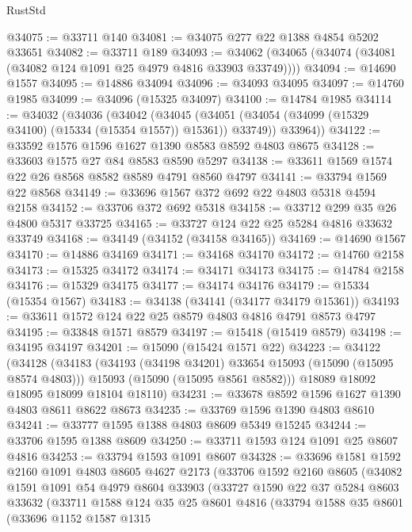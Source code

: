 \begin{lexlean}{RustStd}
\begin{coremodule}
@34075 := @33711 @140
@34081 := @34075 @277 @22 @1388 @4854 @5202 @33651
@34082 := @33711 @189
@34093 := @34062 (@34065 (@34074 (@34081 (@34082 @124 @1091 @25 @4979 @4816 @33903 @33749))))
@34094 := @14690 @1557
@34095 := @14886 @34094
@34096 := @34093 @34095
@34097 := @14760 @1985
@34099 := @34096 (@15325 @34097)
@34100 := @14784 @1985
@34114 := @34032
    (@34036
      (@34042
        (@34045 (@34051 (@34054 (@34099 (@15329 @34100) (@15334 (@15354 @1557)) @15361)) @33749))
        @33964))
@34122 := @33592 @1576 @1596 @1627 @1390 @8583 @8592 @4803 @8675
@34128 := @33603 @1575 @27 @84 @8583 @8590 @5297
@34138 := @33611 @1569 @1574 @22 @26 @8568 @8582 @8589 @4791 @8560 @4797
@34141 := @33794 @1569 @22 @8568
@34149 := @33696 @1567 @372 @692 @22 @4803 @5318 @4594 @2158
@34152 := @33706 @372 @692 @5318
@34158 := @33712 @299 @35 @26 @4800 @5317 @33725
@34165 := @33727 @124 @22 @25 @5284 @4816 @33632 @33749
@34168 := @34149 (@34152 (@34158 @34165))
@34169 := @14690 @1567
@34170 := @14886 @34169
@34171 := @34168 @34170
@34172 := @14760 @2158
@34173 := @15325 @34172
@34174 := @34171 @34173
@34175 := @14784 @2158
@34176 := @15329 @34175
@34177 := @34174 @34176
@34179 := @15334 (@15354 @1567)
@34183 := @34138 (@34141 (@34177 @34179 @15361))
@34193 := @33611 @1572 @124 @22 @25 @8579 @4803 @4816 @4791 @8573 @4797
@34195 := @33848 @1571 @8579
@34197 := @15418 (@15419 @8579)
@34198 := @34195 @34197
@34201 := @15090 (@15424 @1571 @22)
@34223 := @34122
    (@34128
      (@34183
        (@34193 (@34198 @34201) @33654 @15093 (@15090 (@15095 @8574 @4803)))
        @15093
        (@15090 (@15095 @8561 @8582)))
      @18089
      @18092
      @18095
      @18099
      @18104
      @18110)
@34231 := @33678 @8592 @1596 @1627 @1390 @4803 @8611 @8622 @8673
@34235 := @33769 @1596 @1390 @4803 @8610
@34241 := @33777 @1595 @1388 @4803 @8609 @5349 @15245
@34244 := @33706 @1595 @1388 @8609
@34250 := @33711 @1593 @124 @1091 @25 @8607 @4816
@34253 := @33794 @1593 @1091 @8607
@34328 := @33696
    @1581
    @1592
    @2160
    @1091
    @4803
    @8605
    @4627
    @2173
    (@33706
      @1592
      @2160
      @8605
      (@34082
        @1591
        @1091
        @54
        @4979
        @8604
        @33903
        (@33727
          @1590
          @22
          @37
          @5284
          @8603
          @33632
          (@33711
            @1588
            @124
            @35
            @25
            @8601
            @4816
            (@33794
              @1588
              @35
              @8601
              (@33696
                @1152
                @1587
                @1315

\end{coremodule}
\end{lexlean}
